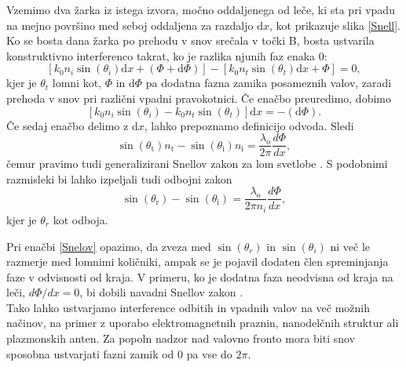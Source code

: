 \documentclass[12pt ]{article}
\begin{document}
 Vzemimo dva žarka iz istega izvora, močno oddaljenega od leče, ki sta pri vpadu na mejno površino med seboj oddaljena za razdaljo $\text{d}x$, kot prikazuje slika \ref{Snell}. Ko se bosta dana žarka po prehodu v snov srečala v točki B, bosta ustvarila konstruktivno interferenco takrat, ko je razlika njunih faz enaka 0:
 \begin{equation}
     \left[k_0n_i\sin(\theta_i)\text{d}x+(\Phi+\text{d}\Phi)\right]-\left[k_0n_t\sin(\theta_t)\text{d}x+\Phi\right]=0,
 \end{equation}
 kjer je $\theta_t$ lomni kot, $\Phi$ in $\text{d}\Phi$ pa dodatna fazna zamika  posameznih valov, zaradi prehoda v snov pri različni vpadni pravokotnici. Če enačbo preuredimo, dobimo 
 \begin{equation}
     \left[k_0n_i\sin(\theta_i)-k_0n_t\sin(\theta_t)\right]\text{d}x=-\left(\text{d}\Phi\right).
 \end{equation}
 Če sedaj enačbo delimo z $\text{d}x$, lahko prepoznamo definicijo odvoda. Sledi
 \begin{equation}
\sin \left(\theta_{\mathrm{t}}\right) n_{\mathrm{t}}-\sin \left(\theta_{\mathrm{i}}\right) n_{\mathrm{i}}=\frac{\lambda_{\mathrm{o}}}{2 \pi} \frac{d \Phi}{d x},
\label{Snelov}
\end{equation}
čemur pravimo tudi generalizirani Snellov zakon za lom svetlobe \cite{Snell}. S podobnimi razmisleki bi lahko izpeljali tudi odbojni zakon
 \begin{equation}
\sin \left(\theta_{\mathrm{r}}\right) -\sin \left(\theta_{\mathrm{i}}\right) =\frac{\lambda_{\mathrm{o}}}{2 \pi n_i} \frac{d \Phi}{d x},
\end{equation}
kjer je $\theta_r$ kot odboja.

Pri enačbi \eqref{Snelov} opazimo, da zveza med $\sin(\theta_r)$ in $\sin(\theta_i)$ ni več le razmerje med lomnimi količniki, ampak se je pojavil dodaten člen spreminjanja faze v odvisnosti od kraja. V primeru, ko je dodatna faza neodvisna od kraja na leči, $d \Phi/d x=0$, bi dobili navadni Snellov zakon \cite{Snell}.\\


Tako lahko ustvarjamo interference odbitih in vpadnih valov na več možnih načinov, na primer z uporabo elektromagnetnih praznin, nanodelčnih struktur ali plazmonskih anten. Za popoln nadzor nad valovno fronto mora biti snov sposobna ustvarjati fazni zamik od 0 pa vse do $2\pi$.

 
 
\end{document}
